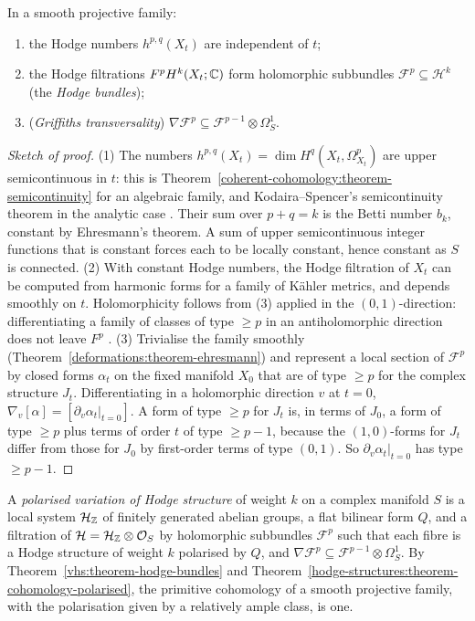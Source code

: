 \begin{theorem}\label{vhs:theorem-hodge-bundles}
In a smooth projective family:
\begin{enumerate}
\item the Hodge numbers $h^{p,q}(X_t)$ are independent of $t$;
\item the Hodge filtrations $F^pH^k(X_t; \mathbb{C})$ form holomorphic subbundles $\mathcal{F}^p \subseteq \mathcal{H}^k$ (the \emph{Hodge bundles});
\item (\emph{Griffiths transversality}) $\nabla\mathcal{F}^p \subseteq \mathcal{F}^{p-1} \otimes \Omega^1_S$.
\end{enumerate}
\end{theorem}

\begin{proof}[Sketch of proof]
(1) The numbers $h^{p,q}(X_t) = \dim H^q(X_t, \Omega^p_{X_t})$ are upper semicontinuous in $t$: this is Theorem~\ref{coherent-cohomology:theorem-semicontinuity} for an algebraic family, and
Kodaira--Spencer's semicontinuity theorem in the analytic case \cite[Chapter 9]{voisin-hodge-1}. Their sum over $p + q = k$ is the Betti number $b_k$, constant by Ehresmann's theorem. A sum of
upper semicontinuous integer functions that is constant forces each to be locally constant, hence constant as $S$ is connected. (2) With constant Hodge numbers, the Hodge
filtration of $X_t$ can be computed from harmonic forms for a family of K\"ahler metrics, and depends smoothly on $t$. Holomorphicity follows from (3) applied in the $(0,1)$-direction:
differentiating a family of classes of type $\geq p$ in an antiholomorphic direction does not leave $F^p$ \cite[Chapter 10]{voisin-hodge-1}. (3) Trivialise the family smoothly
(Theorem~\ref{deformations:theorem-ehresmann}) and represent a local section of $\mathcal{F}^p$ by closed forms $\alpha_t$ on the fixed manifold $X_0$ that are of type $\geq p$ for the complex structure
$J_t$. Differentiating in a holomorphic direction $v$ at $t = 0$, $\nabla_v[\alpha] = [\partial_v\alpha_t|_{t=0}]$. A form of type $\geq p$ for $J_t$ is, in terms of $J_0$, a form of type $\geq p$ plus terms
of order $t$ of type $\geq p - 1$, because the $(1,0)$-forms for $J_t$ differ from those for $J_0$ by first-order terms of type $(0,1)$. So $\partial_v\alpha_t|_{t=0}$ has type $\geq p - 1$.
\end{proof}

\begin{definition}\label{vhs:definition-vhs}
A \emph{polarised variation of Hodge structure} of weight $k$ on a complex manifold $S$ is a local system $\mathcal{H}_{\mathbb{Z}}$ of finitely generated abelian groups, a flat bilinear form $Q$, and a
filtration of $\mathcal{H} = \mathcal{H}_{\mathbb{Z}} \otimes \mathcal{O}_S$ by holomorphic subbundles $\mathcal{F}^p$ such that each fibre is a Hodge structure of weight $k$ polarised by $Q$, and
$\nabla\mathcal{F}^p \subseteq \mathcal{F}^{p-1} \otimes \Omega^1_S$. By Theorem~\ref{vhs:theorem-hodge-bundles} and Theorem~\ref{hodge-structures:theorem-cohomology-polarised}, the primitive
cohomology of a smooth projective family, with the polarisation given by a relatively ample class, is one.
\end{definition}

